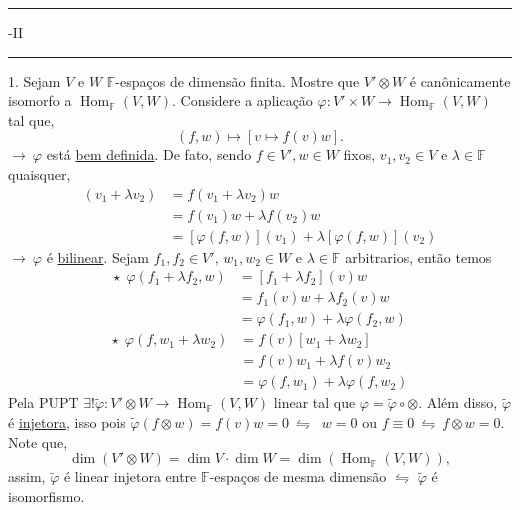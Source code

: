 \newcommand{\F}{\mathbb{F}}
\newcommand{\C}{\mathbb{C}}
\newcommand{\an}{\mathscr{A}} 
\newcommand{\Q}{\mathbb{Q}}
\renewcommand{\hom}{\operatorname{Hom}_\F}
\newcommand{\ehom}{\operatorname{End}_\F}

\-\vspace{-0.3cm}
  {\hrule \vspace{-0.15cm}
  -II \vspace{0.1cm}
  \hrule}

1. Sejam \(V\) e \(W\) \(\F\)-espaços de dimensão finita. Mostre que \(V' \otimes W\) é canônicamente isomorfo a \(\hom(V,W)\). \newline
    \textcolor{gris}{Considere a aplicação \(\varphi: V' \times W \to \hom(V,W)\)  tal que, 
     \[   (f,w) \mapsto [v\mapsto f(v) w].\]
    \(\rightarrow \ \varphi\) está \underline{bem definida}. De fato, sendo \(f \in V', w \in W\) fixos, \(v_1, v_2 \in V\) e \(\lambda \in \F\) quaisquer,    
    \begin{align*}
        [\varphi(f,w)](v_1 + \lambda v_2) &= f(v_1+\lambda v_2) w \\ 
         &= f(v_1) w +\lambda f(v_2) w \\ 
        &=[\varphi(f,w)](v_1) + \lambda [\varphi(f,w)](v_2)  
    \end{align*}
    \(\rightarrow \ \varphi\) é \underline{bilinear}. Sejam \(f_1, f_2 \in V'\), \(w_1, w_2 \in W\) e \(\lambda \in \F \) arbitrarios, então temos 
    \begin{align*}
    \star \ \      \varphi(f_1 + \lambda f_2, w) &= [f_1 + \lambda f_2](v) w \\ 
        &= f_1(v) w + \lambda f_2(v) w\\ 
        &= \varphi(f_1,  w) + \lambda \varphi (f_2, w)  
    \end{align*}
    \begin{align*}
    \star \ \      \varphi(f, w_1 + \lambda w_2) &= f(v)[w_1 + \lambda w_2] \\ 
        &= f(v) w_1+ \lambda f(v) w_2 \\ 
        &= \varphi(f,  w_1) + \lambda \varphi (f, w_2) 
    \end{align*}
    Pela PUPT \(\exists ! \widetilde{\varphi}: V'\otimes W \to \hom(V,W)\) linear tal que \(\varphi = \widetilde{\varphi}\circ \otimes\). Além disso, \(\widetilde{\varphi}\) é \underline{injetora}, isso pois \(\widetilde{\varphi}(f\otimes w) = f(v) w = 0 \ \leftrightharpoons \ \) \(w=0\) ou \(f \equiv 0 \ \leftrightharpoons \ f\otimes w = 0 \). Note que, 
    \[\dim (V'\otimes W) = \dim V \cdot \dim W = \dim (\hom(V,W)), \]
    assim, \(\widetilde{\varphi}\) é linear injetora entre \(\F\)-espaços de mesma dimensão \(\leftrightharpoons\) \(\widetilde{\varphi}\) é isomorfismo. 
    } \\ 
